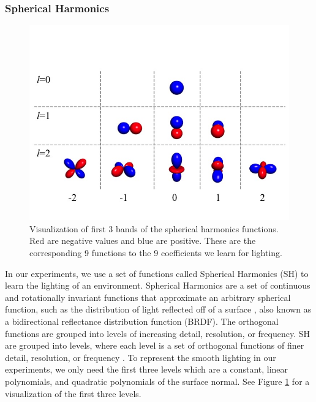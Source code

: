 \documentclass[10pt,twocolumn,letterpaper]{article}
\begin{document}
\subsubsection{Spherical Harmonics}
\begin{figure}[h!]
\centering
\includegraphics[width=1.0\columnwidth]{./assets/SH_Fig.jpg}
\caption{Visualization of first 3 bands of the spherical harmonics functions. Red are negative values and blue are positive. These are the corresponding 9 functions to the 9 coefficients we learn for lighting.}
\label{fig:SHBands01}
\end{figure}

In our experiments, we use a set of functions called Spherical Harmonics (SH) to learn the lighting of an environment. Spherical Harmonics are a set of continuous and rotationally invariant functions that approximate an arbitrary spherical function, such as the distribution of light reflected off of a surface \cite{Ramamoorthi:2001:ERI:383259.383317}, also known as a bidirectional reflectance distribution function (BRDF). The orthogonal functions are grouped into levels of increasing detail, resolution, or frequency. SH are grouped into levels, where each level is a set of orthogonal functions of finer detail, resolution, or frequency \cite{Shreiner:2013:OPG:2544032}.  To represent the smooth lighting in our experiments, we only need the first three levels which are a constant, linear polynomials, and quadratic polynomials of the surface normal. See Figure \ref{fig:SHBands01} for a visualization of the first three levels.
\end{document}

